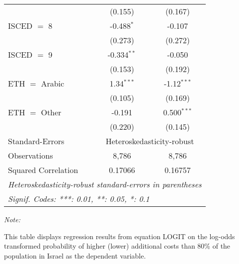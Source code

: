 \begin{table}[htbp!]
\begin{adjustbox}{width = 1\textwidth, max height = 0.95\textheight, center}
\begin{threeparttable}[b]
\begin{tabular}{lcc}
                                 & (0.155)        & (0.167)\\   
            ISCED $=$ 8          & -0.488$^{*}$   & -0.107\\   
                                 & (0.273)        & (0.272)\\   
            ISCED $=$ 9          & -0.334$^{**}$  & -0.050\\   
                                 & (0.153)        & (0.192)\\   
            ETH $=$ Arabic       & 1.34$^{***}$   & -1.12$^{***}$\\   
                                 & (0.105)        & (0.169)\\   
            ETH $=$ Other        & -0.191         & 0.500$^{***}$\\   
                                 & (0.220)        & (0.145)\\   
            \midrule 
            Standard-Errors & \multicolumn{2}{c}{Heteroskedasticity-robust} \\ 
            Observations         & 8,786          & 8,786\\  
            Squared Correlation  & 0.17066        & 0.16757\\  
            \midrule \midrule
            \multicolumn{3}{l}{\emph{Heteroskedasticity-robust standard-errors in parentheses}}\\
            \multicolumn{3}{l}{\emph{Signif. Codes: ***: 0.01, **: 0.05, *: 0.1}}\\
         \end{tabular}
         
         \begin{tablenotes}\item \medskip \textit{Note:}
            \item This table displays regression results from equation LOGIT on the log-odds transformed probability of higher (lower) additional costs than 80\% of the population in Israel as the dependent variable. 
         \end{tablenotes}
      \end{threeparttable}
   \end{adjustbox}
\end{table}


